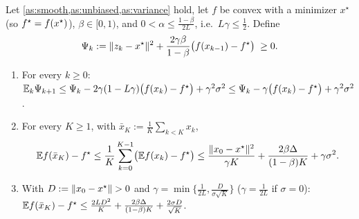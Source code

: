 \begin{tcolorbox}[keybox]
\begin{theorem}\label{thm:convex}
Let \cref{as:smooth,as:unbiased,as:variance} hold, let $f$ be convex with a minimizer
$x^\star$ (so $f^\star=f(x^\star)$), $\beta\in[0,1)$, and $0<\alpha\le\frac{1-\beta}{2L}$, i.e.\
$L\gamma\le\frac12$. Define
\[
  \Psi_k:=\lVert z_k-x^\star\rVert^2+\frac{2\gamma\beta}{1-\beta}\bigl(f(x_{k-1})-f^\star\bigr)\;\ge0 .
\]
\begin{enumerate}[label=\textup{(\alph*)}]
\item For every $k\ge0$:
  $\mathbb{E}_k\Psi_{k+1}\le\Psi_k-2\gamma(1-L\gamma)\bigl(f(x_k)-f^\star\bigr)+\gamma^2\sigma^2
  \le\Psi_k-\gamma\bigl(f(x_k)-f^\star\bigr)+\gamma^2\sigma^2$.
\item For every $K\ge1$, with $\bar x_K:=\frac1K\sum_{k<K}x_k$,
  \[
    \mathbb{E} f(\bar x_K)-f^\star\le\frac1K\sum_{k=0}^{K-1}\bigl(\mathbb{E} f(x_k)-f^\star\bigr)
    \le\frac{\lVert x_0-x^\star\rVert^2}{\gamma K}+\frac{2\beta\Delta}{(1-\beta)K}+\gamma\sigma^2 .
  \]
\item With $D:=\lVert x_0-x^\star\rVert>0$ and $\gamma=\min\{\frac1{2L},\frac{D}{\sigma\sqrt K}\}$
  ($\gamma=\frac1{2L}$ if $\sigma=0$):
  $\mathbb{E} f(\bar x_K)-f^\star\le\frac{2LD^2}{K}+\frac{2\beta\Delta}{(1-\beta)K}+\frac{2\sigma D}{\sqrt K}$.
\end{enumerate}
\end{theorem}
\end{tcolorbox}

